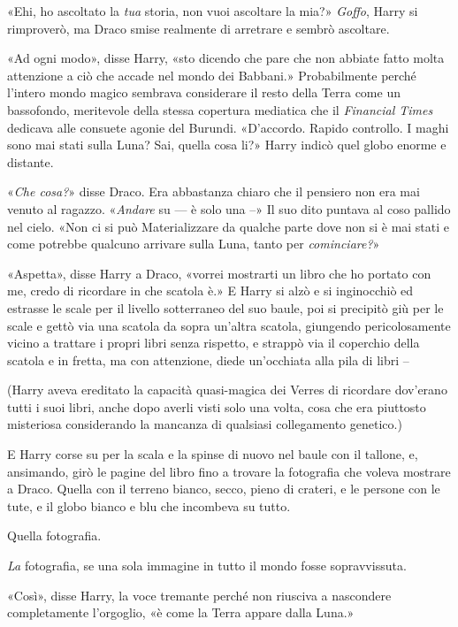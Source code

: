 «Ehi, ho ascoltato la \textit{tua} storia, non vuoi ascoltare la mia?» \textit{Goffo}, Harry si rimproverò, ma Draco smise realmente di arretrare e sembrò ascoltare.

«Ad ogni modo», disse Harry, «sto dicendo che pare che non abbiate fatto molta attenzione a ciò che accade nel mondo dei Babbani.» Probabilmente perché l’intero mondo magico sembrava considerare il resto della Terra come un bassofondo, meritevole della stessa copertura mediatica che il \textit{Financial Times} dedicava alle consuete agonie del Burundi. «D’accordo. Rapido controllo. I maghi sono mai stati sulla Luna? Sai, quella cosa li?» Harry indicò quel globo enorme e distante.

«\textit{Che cosa?}» disse Draco. Era abbastanza chiaro che il pensiero non era mai venuto al ragazzo. «\textit{Andare} su — è solo una –» Il suo dito puntava al coso pallido nel cielo. «Non ci si può Materializzare da qualche parte dove non si è mai stati e come potrebbe qualcuno arrivare sulla Luna, tanto per \textit{cominciare?}»

«Aspetta», disse Harry a Draco, «vorrei mostrarti un libro che ho portato con me, credo di ricordare in che scatola è.» E Harry si alzò e si inginocchiò ed estrasse le scale per il livello sotterraneo del suo baule, poi si precipitò giù per le scale e gettò via una scatola da sopra un’altra scatola, giungendo pericolosamente vicino a trattare i propri libri senza rispetto, e strappò via il coperchio della scatola e in fretta, ma con attenzione, diede un’occhiata alla pila di libri –

(Harry aveva ereditato la capacità quasi-magica dei Verres di ricordare dov’erano tutti i suoi libri, anche dopo averli visti solo una volta, cosa che era piuttosto misteriosa considerando la mancanza di qualsiasi collegamento genetico.)

E Harry corse su per la scala e la spinse di nuovo nel baule con il tallone, e, ansimando, girò le pagine del libro fino a trovare la fotografia che voleva mostrare a Draco.
Quella con il terreno bianco, secco, pieno di crateri, e le persone con le tute, e il globo bianco e blu che incombeva su tutto.


Quella fotografia.

\textit{La} fotografia, se una sola immagine in tutto il mondo fosse sopravvissuta.

«Così», disse Harry, la voce tremante perché non riusciva a nascondere completamente l’orgoglio, «è come la Terra appare dalla Luna.»

